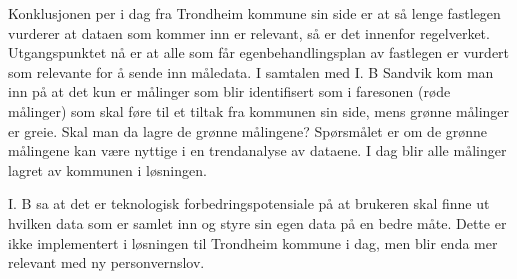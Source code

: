 Konklusjonen per i dag fra Trondheim kommune sin side er at så lenge fastlegen vurderer at dataen som kommer inn er relevant, så er det innenfor
regelverket. Utgangspunktet nå er at alle som får egenbehandlingsplan av fastlegen er vurdert som relevante for å sende inn måledata. I samtalen
med I. B Sandvik kom man inn på at det kun er målinger som blir identifisert som i faresonen (røde målinger) som skal føre til et tiltak fra
kommunen sin side, mens grønne målinger er greie. Skal man da lagre de grønne målingene?
Spørsmålet er om de grønne målingene kan være nyttige i en trendanalyse av dataene.
I dag blir alle målinger lagret av kommunen i løsningen.

I. B sa at det er teknologisk forbedringspotensiale på at brukeren skal finne
ut hvilken data som er samlet inn og styre sin egen data på en bedre måte. Dette er ikke implementert i løsningen til Trondheim kommune i dag,
men blir enda mer relevant med ny personvernslov.
